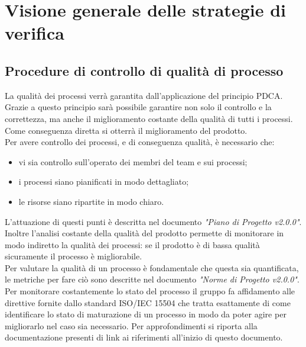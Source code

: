 \documentclass[12pt,a4paper,titlepage]{article}
\begin{document}
	\newpage
	\section{Visione generale delle strategie di verifica}
	\subsection{Procedure di controllo di qualità di processo}
	La qualità dei processi verrà garantita dall'applicazione del principio PDCA. Grazie a questo principio sarà possibile garantire non solo il controllo e la correttezza, ma anche il miglioramento costante della qualità di tutti i processi. Come conseguenza diretta si otterrà il miglioramento del prodotto.\\
	Per avere controllo dei processi, e di conseguenza qualità, è necessario che:
	\begin{itemize}
		\item vi sia controllo sull'operato dei membri del team e sui processi;
		\item i processi siano pianificati in modo dettagliato;
		\item le risorse siano ripartite in modo chiaro.
	\end{itemize}
	L'attuazione di questi punti è descritta nel documento \textit{"Piano di Progetto v2.0.0"}. Inoltre l'analisi costante della qualità del prodotto permette di monitorare in modo indiretto la qualità dei processi: se il prodotto è di bassa qualità sicuramente il processo è migliorabile.\\
	Per valutare la qualità di un processo è fondamentale che questa sia quantificata, le metriche per fare ciò sono descritte nel documento \textit{"Norme di Progetto v2.0.0"}.\\
	
	Per monitorare costantemente lo stato del processo il gruppo fa affidamento alle direttive fornite dallo standard ISO/IEC 15504 che tratta esattamente di come identificare lo stato di maturazione di un processo in modo da poter agire per migliorarlo nel caso sia necessario. Per approfondimenti si riporta alla documentazione presenti di link ai riferimenti all'inizio di questo documento.\\
	
\end{document}
